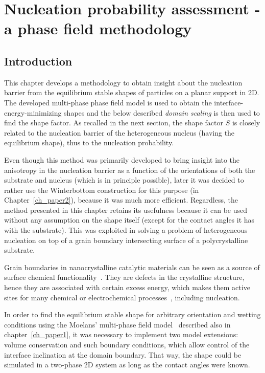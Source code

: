 \chapter{Nucleation probability assessment - a phase field methodology}\label{ch_NPA_PF_methodology}

\section{Introduction}
This chapter develops a methodology to obtain insight about the nucleation barrier from the equilibrium stable shapes of particles on a planar support in 2D. The developed multi-phase phase field model is used to obtain the interface-energy-minimizing shapes and the below described \textit{domain scaling} is then used to find the shape factor. As recalled in the next section, the shape factor $S$ is closely related to the nucleation barrier of the heterogeneous nucleus (having the equilibrium shape), thus to the nucleation probability. 

Even though this method was primarily developed to bring insight into the anisotropy in the nucleation barrier as a function of the orientations of both the substrate and nucleus (which is in principle possible), later it was decided to rather use the Winterbottom construction for this purpose (in Chapter~\ref{ch_paper2}), because it was much more efficient. Regardless, the method presented in this chapter retains its usefulness because it can be used without any assumption on the shape itself (except for the contact angles it has with the substrate). This was exploited in solving a problem of heterogeneous nucleation on top of a grain boundary intersecting surface of a polycrystalline substrate. 

Grain boundaries in nanocrystalline catalytic materials can be seen as a source of surface chemical functionality~\cite{Landau2014}. They are defects in the crystalline structure, hence they are associated with certain excess energy, which makes them active sites for many chemical or electrochemical processes~\cite{Landau2014,Xu2024,Wang2024}, including nucleation. 

In order to find the equilibrium stable shape for arbitrary orientation and wetting conditions using the Moelans' multi-phase field model~\cite{Moelans2008} described also in chapter~\ref{ch_paper1}, it was necessary to implement two model extensions: volume conservation and such boundary conditions, which allow control of the interface inclination at the domain boundary. That way, the shape could be simulated in a two-phase 2D system as long as the contact angles were known.

